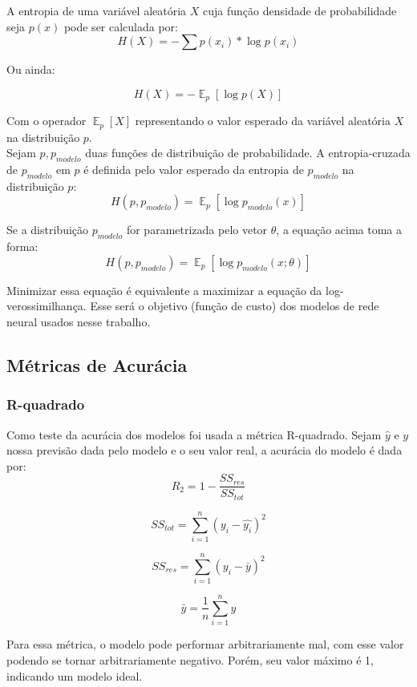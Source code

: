A entropia de uma variável aleatória $X$ cuja função densidade
de probabilidade seja $p(x)$ pode ser calculada por: \\

\[ H(X)  = - \sum p(x_i)*\log p(x_i) \]

Ou ainda:

\[H(X) = - \mathop{\mathbb{E}}_p[\log p(X)] \]

Com o operador $\mathop{\mathbb{E}}_p[X]$ representando o valor esperado da
variável aleatória $X$ na distribuição $p$. \\

Sejam $p,p_{modelo}$ duas funções de distribuição de probabilidade. A entropia-cruzada de $p_{modelo}$ em $p$ é definida pelo valor
esperado da entropia de $p_{modelo}$ na distribuição $p$: \\

\[H(p,p_{modelo}) =  \mathop{\mathbb{E}}_p[\log p_{modelo}(x)] \]

Se a distribuição $p_{modelo}$ for parametrizada pelo vetor $\theta$, a equação
acima toma a forma: \\


\[H(p,p_{modelo}) =  \mathop{\mathbb{E}}_p[\log p_{modelo}(x ; \theta)] \]

Minimizar essa equação é equivalente a maximizar a equação da
log-verossimilhança. Esse será o objetivo (função de custo) dos modelos de rede neural usados
nesse trabalho.  

\subsection{Métricas de Acurácia}

\subsubsection{R-quadrado}
Como teste da acurácia dos modelos foi usada a métrica R-quadrado. Sejam $\hat{y}$ e $y$ nossa previsão dada pelo modelo e o seu valor real, a acurácia do modelo é dada por:\\

\[R_2 = 1 - \frac{SS_{res}}{SS_{tot}}\]

\[SS_{tot} = \sum^n_{i=1} (y_i- \hat{y_i})^2\]

\[SS_{res} = \sum^n_{i=1} (y_i - \bar{y})^2\]

\[ \bar{y} = \frac{1}{n} \sum^n_{i=1} y\]

Para essa métrica, o modelo pode performar arbitrariamente mal, com esse valor
podendo se tornar arbitrariamente negativo. Porém, seu valor máximo é 1,
indicando um modelo ideal.\\


